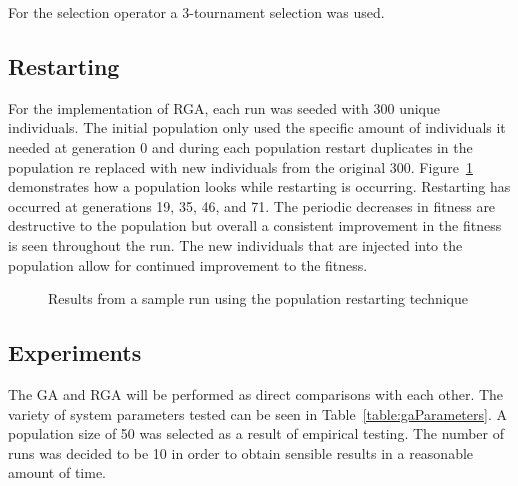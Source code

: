 \documentclass[conference]{IEEEtran}
\begin{document}
For the selection operator a 3-tournament selection was used.

\subsection{Restarting}
\label{subsec:restarting}

For the implementation of RGA, each run was seeded with 300 unique individuals. The initial population only used the specific amount of individuals it needed at generation 0 and during each population restart duplicates in the population re replaced with new individuals from the original 300. Figure~\ref{fig:bestRunRestarting} demonstrates how a population looks while restarting is occurring. Restarting has occurred at generations 19, 35, 46, and 71. The periodic decreases in fitness are destructive to the population but overall a consistent improvement in the fitness is seen throughout the run. The new individuals that are injected into the population allow for continued improvement to the fitness.

\begin{figure}
\caption{Results from a sample run using the population restarting technique}
\label{fig:bestRunRestarting}
\begin{center}
\end{center}
\end{figure}

\subsection{Experiments}

The GA and RGA will be performed as direct comparisons with each other. The variety of system parameters tested can be seen in Table~\ref{table:gaParameters}. A population size of 50 was selected as a result of empirical testing. The number of runs was decided to be 10 in order to obtain sensible results in a reasonable amount of time.
\end{document}
